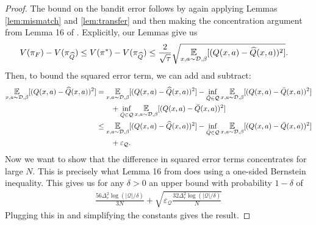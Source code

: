 \begin{subappendices}
\begin{proof}
The bound on the bandit error follows by again applying Lemmas \ref{lem:mismatch} and \ref{lem:transfer} and then making the concentration argument from Lemma 16 of \cite{chen2019information}. Explicitly, our Lemmas give us
\begin{align}
    V(\pi_F) - V(\pi_{\widehat Q}) \leq V(\pi^*) - V(\pi_{\widehat Q}) &\leq \frac{2}{\sqrt{\tau}} \sqrt{\E_{x,a\sim \mathcal{D}, \beta}[(Q(x,a) - \widehat Q(x,a))^2]}.
\end{align}
Then, to bound the squared error term, we can add and subtract:
\begin{align}
    \E_{x,a\sim \mathcal{D}, \beta}[(Q(x,a) - \widehat Q(x,a))^2] &= \E_{x,a\sim \mathcal{D}, \beta}[(Q(x,a) - \widehat Q(x,a))^2] - \inf_{\bar Q \in \mathcal{Q}}\E_{x,a\sim \mathcal{D}, \beta}[(Q(x,a) - \bar Q(x,a))^2] \\ &\qquad+ \inf_{\bar Q \in \mathcal{Q}}\E_{x,a\sim \mathcal{D}, \beta}[(Q(x,a) - \bar Q(x,a))^2]\\
    &\leq \E_{x,a\sim \mathcal{D}, \beta}[(Q(x,a) - \widehat Q(x,a))^2] - \inf_{\bar Q \in \mathcal{Q}}\E_{x,a\sim \mathcal{D}, \beta}[(Q(x,a) - \bar Q(x,a))^2] \\&\qquad+ \varepsilon_\mathcal{Q}.
\end{align}
Now we want to show that the difference in squared error terms concentrates for large $ N$. This is precisely what Lemma 16 from \cite{chen2019information} does using a one-sided Bernstein inequality. This gives us for any $ \delta > 0$ an upper bound with probability $ 1-\delta$ of
\begin{align}
    \frac{56\Delta_r^2 \log(|\mathcal{Q}|/\delta)}{3N} + \sqrt{\varepsilon_\mathcal{Q} \frac{32\Delta_r^2 \log(|\mathcal{Q}|/\delta)}{N}}
\end{align}
Plugging this in and simplifying the constants gives the result.
\end{proof}
\end{subappendices}




\printendnotes
